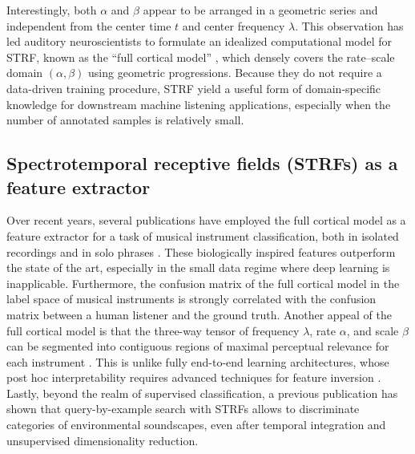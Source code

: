 \documentclass{bmcart}
\begin{document}
Interestingly, both $\alpha$ and $\beta$ appear to be arranged in a geometric series and independent from the center time $t$ and center frequency $\lambda$.
This observation has led auditory neuroscientists to formulate an idealized computational model for STRF, known as the ``full cortical model'' \cite{chi2005jasa}, which densely covers the rate--scale domain $(\alpha, \beta)$ using geometric progressions.
Because they do not require a data-driven training procedure, STRF yield a useful form of domain-specific knowledge for downstream machine listening applications, especially when the number of annotated samples is relatively small.


\subsection*{Spectrotemporal receptive fields (STRFs) as a feature extractor}
Over recent years, several publications have employed the full cortical model as a feature extractor for a task of musical instrument classification, both in isolated recordings \cite{patil2012ploscompbiol} and in solo phrases \cite{patil2015eurasip}.
These biologically inspired features outperform the state of the art, especially in the small data regime where deep learning is inapplicable.
Furthermore, the confusion matrix of the full cortical model in the label space of musical instruments is strongly correlated with the confusion matrix between a human listener and the ground truth.
Another appeal of the full cortical model is that the three-way tensor of frequency $\lambda$, rate $\alpha$, and scale $\beta$ can be segmented into contiguous regions of maximal perceptual relevance for each instrument \cite{thoret2016jasa}.
This is unlike fully end-to-end learning architectures, whose post hoc interpretability requires advanced techniques for feature inversion \cite{mishra2018ismir}.
Lastly, beyond the realm of supervised classification, a previous publication \cite{hemery2015frontiers} has shown that query-by-example search with STRFs allows to discriminate categories of environmental soundscapes, even after temporal integration and unsupervised dimensionality reduction.
\end{document}
